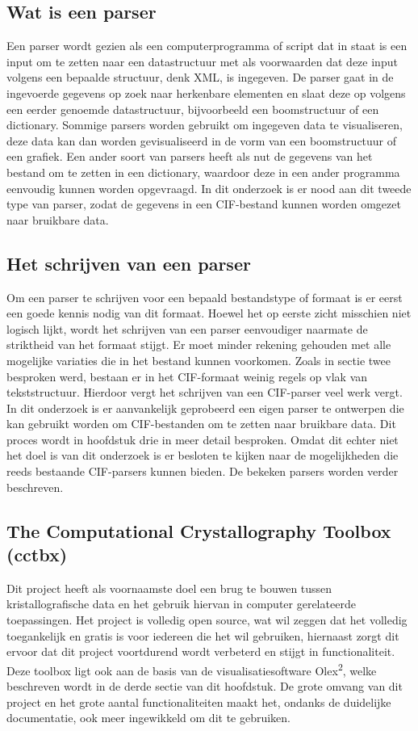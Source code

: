 \subsection{Wat is een parser}
Een parser wordt gezien als een computerprogramma of script dat in staat is een input om te zetten naar een datastructuur met als voorwaarden dat deze input volgens een bepaalde structuur, denk XML, is ingegeven. De parser gaat in de ingevoerde gegevens op zoek naar herkenbare elementen en slaat deze op volgens een eerder genoemde datastructuur, bijvoorbeeld een boomstructuur of een dictionary. Sommige parsers worden gebruikt om ingegeven data te visualiseren, deze data kan dan worden gevisualiseerd in de vorm van een boomstructuur of een grafiek. Een ander soort van parsers heeft als nut de gegevens van het bestand om te zetten in een dictionary, waardoor deze in een ander programma eenvoudig kunnen worden opgevraagd. In dit onderzoek is er nood aan dit tweede type van parser, zodat de gegevens in een CIF-bestand kunnen worden omgezet naar bruikbare data.  

\par
\subsection{Het schrijven van een parser}
Om een parser te schrijven voor een bepaald bestandstype of formaat is er eerst een goede kennis nodig van dit formaat. Hoewel het op eerste zicht misschien niet logisch lijkt, wordt het schrijven van een parser eenvoudiger naarmate de striktheid van het formaat stijgt. Er moet minder rekening gehouden met alle mogelijke variaties die in het bestand kunnen voorkomen. Zoals in sectie twee besproken werd, bestaan er in het CIF-formaat weinig regels op vlak van tekststructuur. Hierdoor vergt het schrijven van een CIF-parser veel werk vergt. In dit onderzoek is er aanvankelijk geprobeerd een eigen parser te ontwerpen die kan gebruikt worden om CIF-bestanden om te zetten naar bruikbare data. Dit proces wordt in hoofdstuk drie in meer detail besproken. Omdat dit echter niet het doel is van dit onderzoek is er besloten te kijken naar de mogelijkheden die reeds bestaande CIF-parsers kunnen bieden. De bekeken parsers worden verder beschreven.  

\par
\subsection{The Computational Crystallography Toolbox (cctbx)}
Dit project heeft als voornaamste doel een brug te bouwen tussen kristallografische data en het gebruik hiervan in computer gerelateerde toepassingen. Het project is volledig open source, wat wil zeggen dat het volledig toegankelijk en gratis is voor iedereen die het wil gebruiken, hiernaast zorgt dit ervoor dat dit project voortdurend wordt verbeterd en stijgt in functionaliteit. Deze toolbox ligt ook aan de basis van de visualisatiesoftware Olex\textsuperscript{2}, welke beschreven wordt in de derde sectie van dit hoofdstuk. De grote omvang van dit project en het grote aantal functionaliteiten maakt het, ondanks de duidelijke documentatie, ook meer ingewikkeld om dit te gebruiken. 

